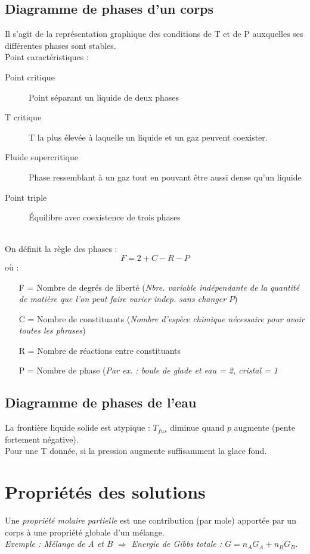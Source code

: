 \documentclass[british,french,11pt, a4paper, openany]{book}
\begin{document}
\subsection{Diagramme de phases d'un corps}
Il s'agit de la représentation graphique des conditions de T et de P auxquelles ses différentes phases sont stables.\\
Point caractéristiques :
\begin{description}
	\item[Point critique] Point séparant un liquide de deux phases
	\item[T critique] T la plus élevée à laquelle un liquide et un gaz peuvent coexister.
	\item[Fluide supercritique] Phase ressemblant à un gaz tout en pouvant être aussi dense qu'un liquide
	\item[Point triple] Équilibre avec coexistence de trois phases
\end{description}
\ \\
On définit la règle des phases :
$$F = 2 + C - R - P$$
où :
\begin{itemize}
	\item[F] = Nombre de degrés de liberté (\textit{Nbre. variable indépendante de la quantité de matière que l'on peut faire varier indep. sans changer $P$})
	\item[C] = Nombre de constituants (\textit{Nombre d'espèce chimique nécessaire pour avoir toutes les phrases})
	\item[R] = Nombre de réactions entre constituants
	\item[P] = Nombre de phase (\textit{Par ex. : boule de glade et eau = 2, cristal = 1}
\end{itemize}
\subsection{Diagramme de phases de l'eau}
La frontière liquide solide est atypique : $T_{fus}$ diminue quand $p$ augmente (pente fortement négative).\\
Pour une T donnée, si la pression augmente suffisamment la glace fond.

\section{Propriétés des solutions}
Une \textit{propriété molaire partielle} est une contribution (par mole) apportée par un corps à une propriété  globale d'un mélange.\\
\textit{Exemple : Mélange de A et B $\Rightarrow$ Energie de Gibbs totale : $G = n_A G_A + n_B G_B$}.\\
\end{document}
